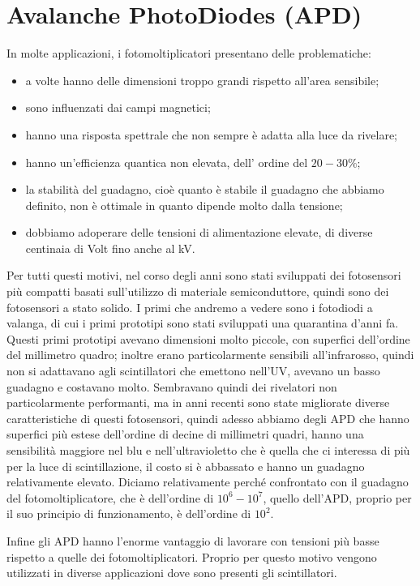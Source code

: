 \section{Avalanche PhotoDiodes (APD)}
In molte applicazioni, i fotomoltiplicatori presentano delle problematiche:
\begin{itemize}
   \item a volte hanno delle dimensioni troppo grandi rispetto all'area sensibile;
   \item sono influenzati dai campi magnetici;
   \item hanno una risposta spettrale che non sempre è adatta alla luce da rivelare;
   \item hanno un'efficienza quantica non elevata, dell' ordine del $20-30\%$;
   \item la stabilità del guadagno, cioè quanto è stabile il guadagno che abbiamo definito, non è ottimale in quanto dipende molto dalla tensione;
   \item dobbiamo adoperare delle tensioni di alimentazione elevate, di diverse centinaia di Volt fino anche al kV.
\end{itemize}
Per tutti questi motivi, nel corso degli anni sono stati sviluppati dei fotosensori più compatti basati sull'utilizzo di materiale semiconduttore, quindi sono dei fotosensori a stato solido. I primi che andremo a vedere sono i fotodiodi a valanga, di cui i primi prototipi sono stati sviluppati una quarantina d'anni fa. Questi primi prototipi avevano dimensioni molto piccole, con superfici dell'ordine del millimetro quadro; inoltre erano particolarmente sensibili all'infrarosso, quindi non si adattavano agli scintillatori che emettono nell'UV, avevano un basso guadagno e costavano molto. Sembravano quindi dei rivelatori non particolarmente performanti, ma in anni recenti sono state migliorate diverse caratteristiche di questi fotosensori, quindi adesso abbiamo degli APD che hanno superfici più estese dell'ordine di decine di millimetri quadri, hanno una sensibilità maggiore nel blu e nell'ultravioletto che è quella che ci interessa di più per la luce di scintillazione, il costo si è abbassato e hanno un guadagno relativamente elevato. Diciamo relativamente perché confrontato con il guadagno del fotomoltiplicatore, che è dell'ordine di $10^6-10^7$, quello dell'APD, proprio per il suo principio di funzionamento, è dell'ordine di $10^2$.

Infine gli APD hanno l'enorme vantaggio di lavorare con tensioni più basse rispetto a quelle dei fotomoltiplicatori. Proprio per questo motivo vengono utilizzati in diverse applicazioni dove sono presenti gli scintillatori.

